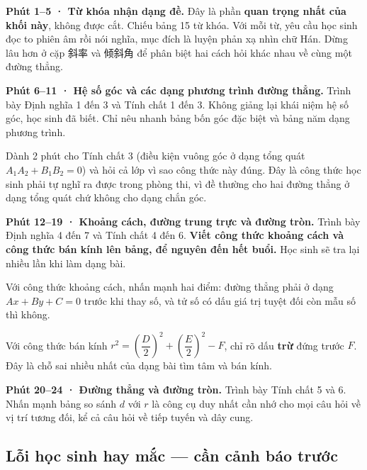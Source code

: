 \documentclass[11pt, a4paper]{article}
\begin{document}
\textbf{Phút 1–5 · Từ khóa nhận dạng đề.} Đây là phần \textbf{quan trọng nhất của khối này}, không được cắt. Chiếu bảng 15 từ khóa. Với mỗi từ, yêu cầu học sinh đọc to phiên âm rồi nói nghĩa, mục đích là luyện phản xạ nhìn chữ Hán. Dừng lâu hơn ở cặp 斜率 và 倾斜角 để phân biệt hai cách hỏi khác nhau về cùng một đường thẳng.

\textbf{Phút 6–11 · Hệ số góc và các dạng phương trình đường thẳng.} Trình bày Định nghĩa 1 đến 3 và Tính chất 1 đến 3. Không giảng lại khái niệm hệ số góc, học sinh đã biết. Chỉ nêu nhanh bảng bốn góc đặc biệt và bảng năm dạng phương trình.

Dành 2 phút cho Tính chất 3 (điều kiện vuông góc ở dạng tổng quát $A_1A_2 + B_1B_2 = 0$) và hỏi cả lớp vì sao công thức này đúng. Đây là công thức học sinh phải tự nghĩ ra được trong phòng thi, vì đề thường cho hai đường thẳng ở dạng tổng quát chứ không cho dạng chắn góc.

\textbf{Phút 12–19 · Khoảng cách, đường trung trực và đường tròn.} Trình bày Định nghĩa 4 đến 7 và Tính chất 4 đến 6. \textbf{Viết công thức khoảng cách và công thức bán kính lên bảng, để nguyên đến hết buổi.} Học sinh sẽ tra lại nhiều lần khi làm dạng bài.

Với công thức khoảng cách, nhấn mạnh hai điểm: đường thẳng phải ở dạng $Ax + By + C = 0$ trước khi thay số, và tử số có dấu giá trị tuyệt đối còn mẫu số thì không.

Với công thức bán kính $r^2 = \left(\dfrac{D}{2}\right)^2 + \left(\dfrac{E}{2}\right)^2 - F$, chỉ rõ dấu \textbf{trừ} đứng trước $F$. Đây là chỗ sai nhiều nhất của dạng bài tìm tâm và bán kính.

\textbf{Phút 20–24 · Đường thẳng và đường tròn.} Trình bày Tính chất 5 và 6. Nhấn mạnh bảng so sánh $d$ với $r$ là công cụ duy nhất cần nhớ cho mọi câu hỏi về vị trí tương đối, kể cả câu hỏi về tiếp tuyến và dây cung.

\subsection{Lỗi học sinh hay mắc — cần cảnh báo trước}

\end{document}
